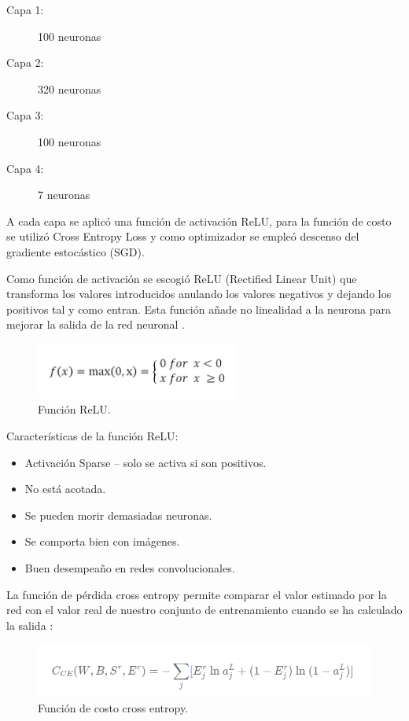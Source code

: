 \documentclass[runningheads]{llncs}
\begin{document}
\begin{description}
	\item[Capa 1:] 100 neuronas
	\item[Capa 2:] 320 neuronas
	\item[Capa 3:] 100 neuronas
	\item[Capa 4:] 7 neuronas
\end{description}

A cada capa se aplic{\'o} una funci{\'o}n de activación ReLU, para la funci{\'o}n de costo se utiliz{\'o} Cross Entropy Loss y como optimizador se empleó descenso del gradiente estocástico (SGD).

Como funci{\'o}n de activaci{\'o}n se escogi{\'o} ReLU (Rectified Linear Unit) que transforma los valores introducidos anulando los valores negativos y dejando los positivos tal y como entran. Esta funci{\'o}n a\~{n}ade no linealidad a la neurona para mejorar la salida de la red neuronal \cite{jurado2020modelos}⁠.

\begin{figure}
	\begin{center}
		\includegraphics[width=0.6\textwidth]{images/relu.png}
		\caption{Funci{\'o}n ReLU.} \label{relu}
	\end{center}
\end{figure}

Caracter{\'i}sticas de la funci{\'o}n ReLU:
\begin{itemize}
	\item Activaci{\'o}n Sparse – solo se activa si son positivos.
	\item No est{\'a} acotada.
	\item Se pueden morir demasiadas neuronas.
	\item Se comporta bien con im{\'a}genes.
	\item Buen desempea\~{n}o en redes convolucionales.
\end{itemize}

La funci{\'o}n de p{\'e}rdida cross entropy permite comparar el valor estimado por la red con el valor real de nuestro conjunto de entrenamiento cuando se ha calculado la salida \cite{gonzalez2020improved}⁠:

\begin{figure}
	\begin{center}
		\includegraphics[width=1\textwidth]{images/cross.png}
		\caption{Funci{\'o}n de costo cross entropy.} \label{cross}
	\end{center}
\end{figure}
\end{document}
